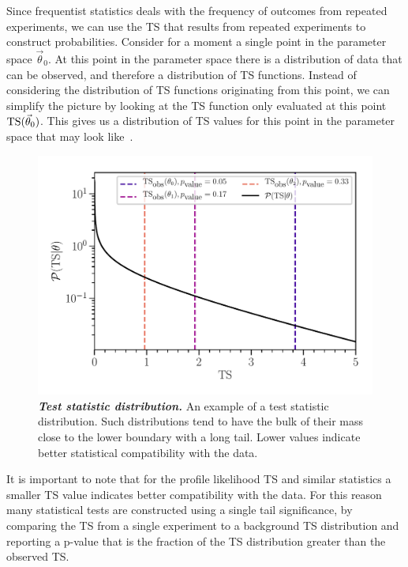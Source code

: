 Since frequentist statistics deals with the frequency of outcomes from repeated experiments, we can use the TS that results from repeated experiments to construct probabilities.
Consider for a moment a single point in the parameter space $\vec\theta_0$.
At this point in the parameter space there is a distribution of data that can be observed, and therefore a distribution of TS functions.
Instead of considering the distribution of TS functions originating from this point, we can simplify the picture by looking at the TS function only evaluated at this point $\mathrm{TS}(\vec\theta_0)$.
This gives us a distribution of TS values for this point in the parameter space that may look like~.
\begin{figure}
	\centering
	\includegraphics[width=0.8\linewidth]{figures/TS_dist}
	\caption{\textbf{\textit{Test statistic distribution.}} An example of a test statistic distribution.
	Such distributions tend to have the bulk of their mass close to the lower boundary with a long tail.
	Lower values indicate better statistical compatibility with the data.
	}
	\label{fig:TS_dist}
\end{figure}
It is important to note that for the profile likelihood TS and similar statistics a smaller TS value indicates better compatibility with the data.
For this reason many statistical tests are constructed using a single tail significance, by comparing the TS from a single experiment to a background TS distribution and reporting a p-value that is the fraction of the TS distribution greater than the observed TS.

